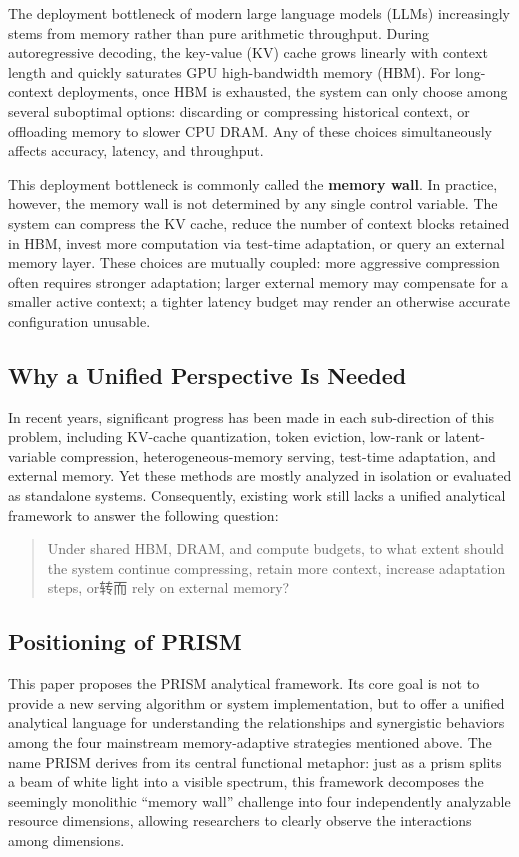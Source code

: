 \documentclass[11pt,a4paper]{article}
\theoremstyle{plain}
\theoremstyle{definition}
\begin{document}
The deployment bottleneck of modern large language models (LLMs) increasingly stems from memory rather than pure arithmetic throughput. During autoregressive decoding, the key-value (KV) cache grows linearly with context length and quickly saturates GPU high-bandwidth memory (HBM). For long-context deployments, once HBM is exhausted, the system can only choose among several suboptimal options: discarding or compressing historical context, or offloading memory to slower CPU DRAM. Any of these choices simultaneously affects accuracy, latency, and throughput.

This deployment bottleneck is commonly called the \textbf{memory wall}. In practice, however, the memory wall is not determined by any single control variable. The system can compress the KV cache, reduce the number of context blocks retained in HBM, invest more computation via test-time adaptation, or query an external memory layer. These choices are mutually coupled: more aggressive compression often requires stronger adaptation; larger external memory may compensate for a smaller active context; a tighter latency budget may render an otherwise accurate configuration unusable.

\subsection{Why a Unified Perspective Is Needed}

In recent years, significant progress has been made in each sub-direction of this problem, including KV-cache quantization, token eviction, low-rank or latent-variable compression, heterogeneous-memory serving, test-time adaptation, and external memory. Yet these methods are mostly analyzed in isolation or evaluated as standalone systems. Consequently, existing work still lacks a unified analytical framework to answer the following question:
\begin{quote}
Under shared HBM, DRAM, and compute budgets, to what extent should the system continue compressing, retain more context, increase adaptation steps, or转而 rely on external memory?
\end{quote}

\subsection{Positioning of PRISM}

This paper proposes the PRISM analytical framework. Its core goal is not to provide a new serving algorithm or system implementation, but to offer a unified analytical language for understanding the relationships and synergistic behaviors among the four mainstream memory-adaptive strategies mentioned above. The name PRISM derives from its central functional metaphor: just as a prism splits a beam of white light into a visible spectrum, this framework decomposes the seemingly monolithic ``memory wall'' challenge into four independently analyzable resource dimensions, allowing researchers to clearly observe the interactions among dimensions.
\end{document}
